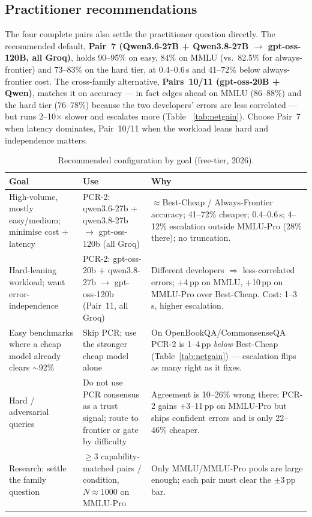 \documentclass[conference]{IEEEtran}
\begin{document}
\subsection{Practitioner recommendations}
The four complete pairs also settle the practitioner question directly. The
recommended default, \textbf{Pair~7 (Qwen3.6-27B + Qwen3.8-27B $\to$
gpt-oss-120B, all Groq)}, holds 90--95\% on easy, 84\% on MMLU (vs.\ 82.5\% for
always-frontier) and 73--83\% on the hard tier, at 0.4--0.6\,s and 41--72\%
below always-frontier cost. The cross-family alternative, \textbf{Pairs~10/11
(gpt-oss-20B + Qwen)}, matches it on accuracy --- in fact edges ahead on MMLU
(86--88\%) and the hard tier (76--78\%) because the two developers' errors are
less correlated --- but runs 2--10$\times$ slower and escalates more (Table~%
\ref{tab:netgain}). Choose Pair~7 when latency dominates, Pair~10/11 when the
workload leans hard and independence matters.

\begin{table}[!t]
\caption{Recommended configuration by goal (free-tier, 2026).}
\label{tab:recs}
\renewcommand{\arraystretch}{1.25}
\begin{tabular}{p{2.4cm} p{2.7cm} p{2.7cm}}
\toprule
\textbf{Goal} & \textbf{Use} & \textbf{Why} \\
\midrule
High-volume, mostly easy/medium; minimise cost + latency
& PCR-2: qwen3.6-27b + qwen3.8-27b $\to$ gpt-oss-120b (all Groq)
& $\approx$Best-Cheap / Always-Frontier accuracy; 41--72\% cheaper; 0.4--0.6\,s;
4--12\% escalation outside MMLU-Pro (28\% there); no truncation. \\
Hard-leaning workload; want error-independence
& PCR-2: gpt-oss-20b + qwen3.8-27b $\to$ gpt-oss-120b (Pair~11, all Groq)
& Different developers $\Rightarrow$ less-correlated errors; +4\,pp on MMLU,
+10\,pp on MMLU-Pro over Best-Cheap. Cost: 1--3\,s, higher escalation. \\
Easy benchmarks where a cheap model already clears $\sim$92\%
& Skip PCR; use the stronger cheap model alone
& On OpenBookQA/CommonsenseQA PCR-2 is 1--4\,pp \textit{below} Best-Cheap
(Table~\ref{tab:netgain}) --- escalation flips as many right as it fixes. \\
Hard / adversarial queries
& Do not use PCR consensus as a trust signal; route to frontier or gate by
difficulty
& Agreement is 10--26\% wrong there; PCR-2 gains +3--11\,pp on MMLU-Pro but
ships confident errors and is only 22--46\% cheaper. \\
Research: settle the family question
& $\geq$3 capability-matched pairs / condition, $N\!\approx\!1000$ on MMLU-Pro
& Only MMLU/MMLU-Pro pools are large enough; each pair must clear the
$\pm3$\,pp bar. \\
\bottomrule
\end{tabular}
\end{table}
\end{document}
